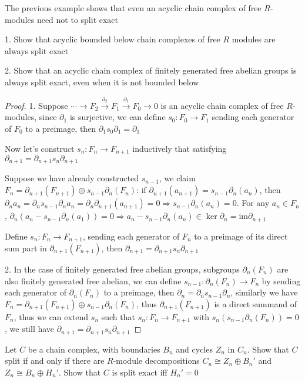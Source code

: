 \documentclass{article}
\newenvironment{exercise}[2][Exercise]{\begin{trivlist}
\item[\hskip \labelsep {\bfseries #1}\hskip \labelsep {\bfseries #2.}]}{\end{trivlist}}
\theoremstyle{definition}
\theoremstyle{remark}
\theoremstyle{definition}
\begin{document}
\begin{exercise}{\textbf{1.4.1}}
The previous example shows that even an acyclic chain complex of free $R$-modules need not to split exact \par
1. Show that acyclic bounded below chain complexes of free $R$ modules are always split exact \par
2. Show that an acyclic chain complex of finitely generated free abelian groups is always split exact, even when it is not bounded below
\end{exercise}

\begin{proof}
1. Suppose $\cdots\to F_2\xrightarrow{\partial_2}F_1\xrightarrow{\partial_1}F_0\to0$ is an acyclic chain complex of free $R$-modules, since $\partial_1$ is surjective, we can define $s_0:F_0\to F_1$ sending each generator of $F_0$ to a preimage, then $\partial_1s_0\partial_1=\partial_1$ \par
Now let's construct $s_n:F_n\to F_{n+1}$ inductively that satisfying $\partial_{n+1}=\partial_{n+1}s_n\partial_{n+1}$ \par
Suppose we have already constructed $s_{n-1}$, we claim $F_n=\partial_{n+1}(F_{n+1})\oplus s_{n-1}\partial_n(F_n)$: if $\partial_{n+1}(a_{n+1})=s_{n-1}\partial_n(a_n)$, then $\partial_na_n=\partial_ns_{n-1}\partial_na_n=\partial_n\partial_{n+1}(a_{n+1})=0\Rightarrow s_{n-1}\partial_n(a_n)=0$. For any $a_n\in F_n$, $\partial_n(a_n-s_{n-1}\partial_n(a_1))=0\Rightarrow a_n-s_{n-1}\partial_n(a_n)\in\ker\partial_n=\mathrm{im}\partial_{n+1}$ \par
Define $s_n:F_n\to F_{n+1}$, sending each generator of $F_n$ to a preimage of its direct sum part in $\partial_{n+1}(F_{n+1})$, then $\partial_{n+1}=\partial_{n+1}s_n\partial_{n+1}$ \par
2. In the case of finitely generated free abelian groups, subgroups $\partial_n(F_n)$ are also finitely generated free abelian, we can define $s_{n-1}:\partial_n(F_n)\to F_n$ by sending each generator of $\partial_n(F_n)$ to a preimage, then $\partial_n=\partial_ns_{n-1}\partial_n$, similarly we have $F_n=\partial_{n+1}(F_{n+1})\oplus s_{n-1}\partial_n(F_n)$, thus $\partial_{n+1}(F_{n+1})$ is a direct summand of $F_n$, thus we can extend $s_n$ such that $s_n:F_n\to F_{n+1}$ with $s_n(s_{n-1}\partial_n(F_n))=0$, we still have $\partial_{n+1}=\partial_{n+1}s_n\partial_{n+1}$
\end{proof}

\begin{exercise}{\textbf{1.4.2}}
Let $C$ be a chain complex, with boundaries $B_n$ and cycles $Z_n$ in $C_n$. Show that $C$ split if and only if there are $R$-module decompositions $C_n\cong Z_n\oplus B_n'$ and $Z_n\cong B_n\oplus H_n'$. Show that $C$ is split exact iff $H_n'=0$
\end{exercise}
\end{document}
